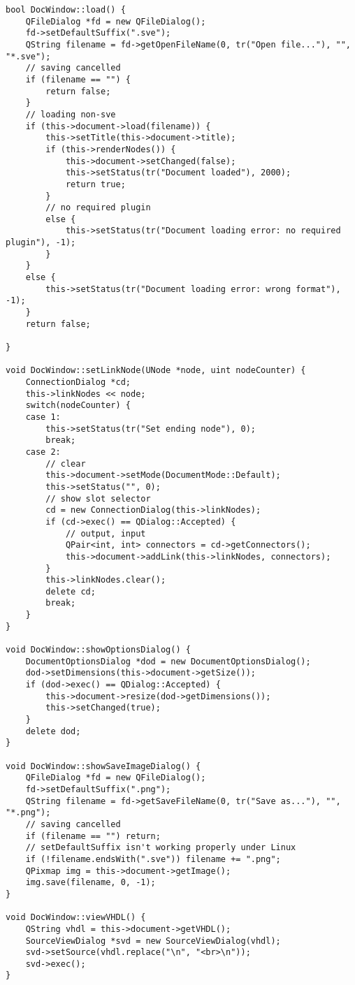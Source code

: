 \begin{lstlisting}
bool DocWindow::load() {
    QFileDialog *fd = new QFileDialog();
    fd->setDefaultSuffix(".sve");
    QString filename = fd->getOpenFileName(0, tr("Open file..."), "", "*.sve");
    // saving cancelled
    if (filename == "") {
        return false;
    }
    // loading non-sve
    if (this->document->load(filename)) {
        this->setTitle(this->document->title);
        if (this->renderNodes()) {
            this->document->setChanged(false);
            this->setStatus(tr("Document loaded"), 2000);
            return true;
        }
        // no required plugin
        else {
            this->setStatus(tr("Document loading error: no required plugin"), -1);
        }
    }
    else {
        this->setStatus(tr("Document loading error: wrong format"), -1);
    }
    return false;

}

void DocWindow::setLinkNode(UNode *node, uint nodeCounter) {
    ConnectionDialog *cd;
    this->linkNodes << node;
    switch(nodeCounter) {
    case 1:
        this->setStatus(tr("Set ending node"), 0);
        break;
    case 2:
        // clear
        this->document->setMode(DocumentMode::Default);
        this->setStatus("", 0);
        // show slot selector
        cd = new ConnectionDialog(this->linkNodes);
        if (cd->exec() == QDialog::Accepted) {
            // output, input
            QPair<int, int> connectors = cd->getConnectors();
            this->document->addLink(this->linkNodes, connectors);
        }
        this->linkNodes.clear();
        delete cd;
        break;
    }
}

void DocWindow::showOptionsDialog() {
    DocumentOptionsDialog *dod = new DocumentOptionsDialog();
    dod->setDimensions(this->document->getSize());
    if (dod->exec() == QDialog::Accepted) {
        this->document->resize(dod->getDimensions());
        this->setChanged(true);
    }
    delete dod;
}

void DocWindow::showSaveImageDialog() {
    QFileDialog *fd = new QFileDialog();
    fd->setDefaultSuffix(".png");
    QString filename = fd->getSaveFileName(0, tr("Save as..."), "", "*.png");
    // saving cancelled
    if (filename == "") return;
    // setDefaultSuffix isn't working properly under Linux
    if (!filename.endsWith(".sve")) filename += ".png";
    QPixmap img = this->document->getImage();
    img.save(filename, 0, -1);
}

void DocWindow::viewVHDL() {
    QString vhdl = this->document->getVHDL();
    SourceViewDialog *svd = new SourceViewDialog(vhdl);
    svd->setSource(vhdl.replace("\n", "<br>\n"));
    svd->exec();
}


\end{lstlisting}
